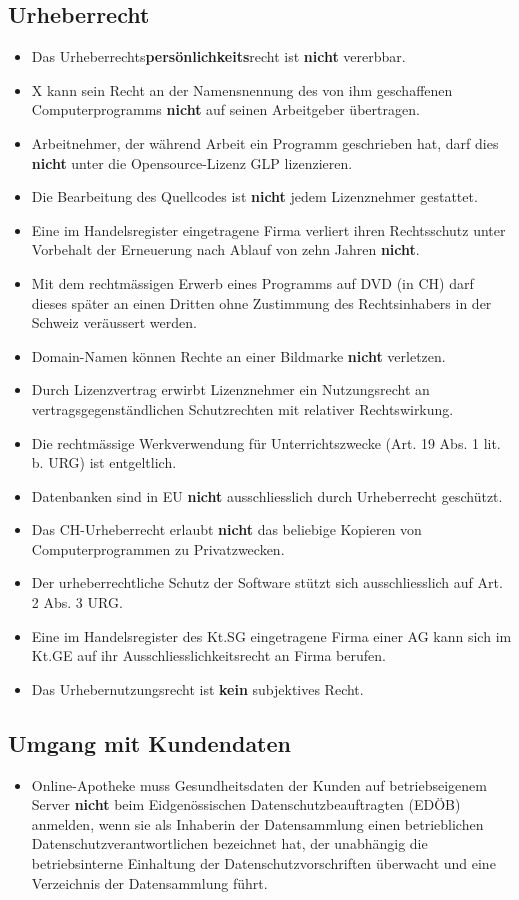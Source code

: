 \subsection{Urheberrecht}
\begin{itemize}
	\item Das Urheberrechts\textbf{persönlichkeits}recht ist \textbf{nicht} vererbbar.
	\item X kann sein Recht an der Namensnennung des von ihm geschaffenen Computerprogramms \textbf{nicht} auf seinen Arbeitgeber übertragen.
	\item Arbeitnehmer, der während Arbeit ein Programm geschrieben hat, darf dies \textbf{nicht} unter die Opensource-Lizenz GLP lizenzieren.
	\item Die Bearbeitung des Quellcodes ist \textbf{nicht} jedem Lizenznehmer gestattet.
	\item Eine im Handelsregister eingetragene Firma verliert ihren Rechtsschutz unter Vorbehalt der Erneuerung nach Ablauf von zehn Jahren \textbf{nicht}.
	\item Mit dem rechtmässigen Erwerb eines Programms auf DVD (in CH) darf dieses später an einen Dritten ohne Zustimmung des Rechtsinhabers in der Schweiz veräussert werden.
	\item Domain-Namen können Rechte an einer Bildmarke \textbf{nicht} verletzen.
	\item Durch Lizenzvertrag erwirbt Lizenznehmer ein Nutzungsrecht an vertragsgegenständlichen Schutzrechten mit relativer Rechtswirkung.
	\item Die rechtmässige Werkverwendung für Unterrichtszwecke (Art. 19 Abs. 1 lit. b. URG) ist entgeltlich.
	\item Datenbanken sind in EU \textbf{nicht} ausschliesslich durch Urheberrecht geschützt.
	\item Das CH-Urheberrecht erlaubt \textbf{nicht} das beliebige Kopieren von Computerprogrammen zu Privatzwecken.
	\item Der urheberrechtliche Schutz der Software stützt sich ausschliesslich auf Art. 2 Abs. 3 URG.
	\item Eine im Handelsregister des Kt.SG eingetragene Firma einer AG kann sich im Kt.GE auf ihr Ausschliesslichkeitsrecht an Firma berufen.
	\item Das Urhebernutzungsrecht ist \textbf{kein} subjektives Recht.
\end{itemize}

\subsection{Umgang mit Kundendaten}
\begin{itemize}
	\item Online-Apotheke muss Gesundheitsdaten der Kunden auf betriebseigenem Server \textbf{nicht} beim Eidgenössischen Datenschutzbeauftragten (EDÖB) anmelden, wenn sie als Inhaberin der Datensammlung einen betrieblichen Datenschutzverantwortlichen bezeichnet hat, der unabhängig die betriebsinterne Einhaltung der Datenschutzvorschriften überwacht und eine Verzeichnis der Datensammlung führt.
\end{itemize}

